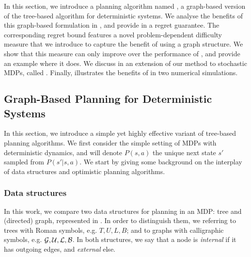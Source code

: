 In this section, we introduce a planning algorithm named \GBOPD, a graph-based version of the tree-based \OPD algorithm for deterministic systems. We analyse the benefits of this graph-based formulation in , and provide in  a regret guarantee. The corresponding regret bound features a novel problem-dependent difficulty measure that we introduce to capture the benefit of using a graph structure. We show that this measure can only improve over the performance of \OPD, and provide an example where it does. We discuss in  an extension of our method to stochastic MDPs, called \GBOP. Finally,  illustrates the benefits of \GBOP in two numerical simulations.

\subsection{Graph-Based Planning for Deterministic Systems}
\label{sec:gbopd}

In this section, we introduce a simple yet highly effective variant of tree-based planning algorithms. We first consider the simple setting of \glspl{MDP} with deterministic dynamics, and will denote $P(s,a)$ the unique next state $s'$ sampled from $P\left(s'|s,a\right)$.
We start by giving some background on the interplay of data structures and optimistic planning algorithms.

\subsubsection{Data structures}

In this work, we compare two data structures for planning in an MDP: tree and (directed) graph, represented in . In order to distinguish them, we referring to trees with Roman symbols, e.g. $T, U, L, B$; and to graphs with calligraphic symbols, e.g. $\mathcal{G}, \mathcal{U}, \mathcal{L}, \mathcal{B}$. In both structures, we say that a node is \emph{internal} if it has outgoing edges, and \emph{external} else.

